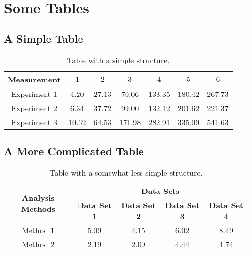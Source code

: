 \section{Some Tables}

\subsection{A Simple Table}

\begin{table}[ht!]
	\centering
	\begin{tabular}{c c c c c c c}
		\toprule
		\textbf{Measurement} & 
		$1$ & 	$2$ & 	$3$ & 	$4$ & 	$5$ & $6$ 
		\\
		\midrule
		Experiment 1 
		& \num{4.20}	
		& \num{27.13}	
		& \num{70.06}	
		& \num{133.35}	
		& \num{180.42}	
		& \num{267.73}	\\ 
		Experiment 2 
		& \num{6.34}	
		& \num{37.72}	
		& \num{99.00}	
		& \num{132.12}	
		& \num{201.62}	
		& \num{221.37}	\\ 
		Experiment 3 
		& \num{10.62}	
		& \num{64.53}	
		& \num{171.98}	
		& \num{282.91}	
		& \num{335.09}	
		& \num{541.63}  \\
		\bottomrule
	\end{tabular}
	\caption{Table with a simple structure.}
	\label{tab4:tauform_vals}
\end{table}



\subsection{A More Complicated Table}

\begin{table}[ht]
	\centering
	\begin{tabular}{c c c c c}
		\toprule
		\multirow{2}{*}{\textbf{Analysis Methods}} &
		\multicolumn{4}{c}{\textbf{Data Sets}} \\
		& 
		\textbf{Data Set 1} & 
		\textbf{Data Set 2} & 
		\textbf{Data Set 3} & 
		\textbf{Data Set 4} \\
		\midrule
		Method 1	& \num{5.09}	& \num{4.15}	& \num{6.02}	& \num{8.49}		\\ 
		Method 2	& \num{2.19}	& \num{2.09}	& \num{4.44}	& \num{4.74}		\\ 
		\bottomrule
	\end{tabular}
	\caption{Table with a somewhat less simple structure.}
	\label{tab2:tau_form_resolution_mean}
\end{table}
